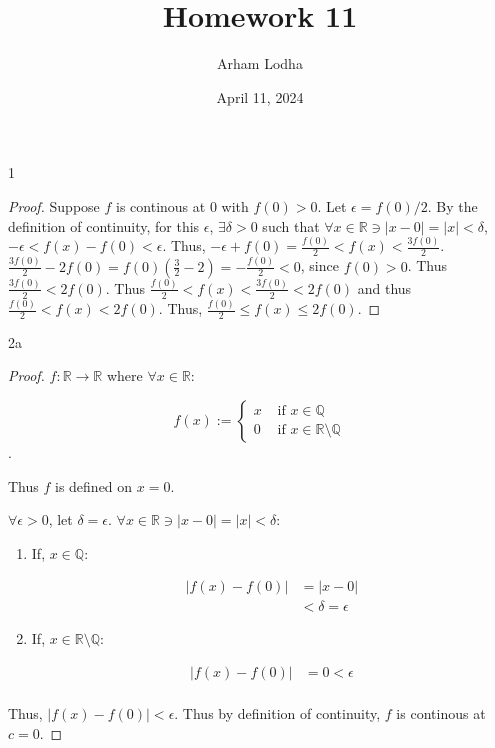 \documentclass{article}
\newcommand{\R}{\mathbb{R}}
\newcommand{\Q}{\mathbb{Q}}
\newcommand{\abs}[1]{\left\lvert #1\right\rvert}
\begin{document}
\title{Homework 11}
\author{Arham Lodha}%
\date{April 11, 2024}%
\maketitle

\begin{PROB}{1}\label{Problem 1.}
\end{PROB}
\begin{proof}
    Suppose $f$ is continous at $0$ with $f(0) > 0$. Let $\epsilon = f(0) / 2$. By the definition of continuity, for this $\epsilon$, $\exists \delta > 0$ such that $\forall x \in \R \ni \abs{x - 0} = \abs{x} < \delta$, $-\epsilon < f(x) - f(0) < \epsilon$. Thus, $-\epsilon + f(0) = \frac{f(0)}{2} < f(x) < \frac{3f(0)}{2}$. $\frac{3f(0)}{2} - 2f(0) = f(0)(\frac{3}{2} - 2) = -\frac{f(0)}{2} < 0$, since $f(0) > 0$. Thus $\frac{3f(0)}{2} < 2f(0)$. Thus $\frac{f(0)}{2} < f(x) < \frac{3f(0)}{2} < 2f(0)$ and thus $\frac{f(0)}{2} < f(x) < 2f(0)$. Thus, $\frac{f(0)}{2} \leq f(x) \leq 2f(0)$.             
\end{proof}

\bigskip

\begin{PROB}{2a}\label{Problem 2a.}
\end{PROB}
\begin{proof}
    $f : \R \to \R$ where $\forall x \in \R$: 
    
    \begin{equation*}
        f(x) := \begin{cases}
            x & \text{ if } x \in \Q \\
            0 & \text{ if } x \in \R \setminus \Q
        \end{cases}
    \end{equation*}. 
    
    Thus $f$ is defined on $x = 0$.   
    
    $\forall \epsilon > 0$, let $\delta = \epsilon$. $\forall x \in \R \ni \abs{x - 0} = \abs{x} < \delta$:
    
    \begin{enumerate}
        \item If, $x \in \Q$:
        
        \begin{align*}
            \abs{f(x) - f(0)} &= \abs{x - 0}\\
            &< \delta = \epsilon
        \end{align*}

        \item If, $x \in \R \setminus \Q$: 
        
        \begin{align*}
            \abs{f(x) -f(0)} &= 0 < \epsilon \\
        \end{align*} 
    \end{enumerate}

    Thus, $\abs{f(x) - f(0)} < \epsilon$. Thus by definition of continuity, $f$ is continous at $c = 0$.  
\end{proof}
\end{document}
